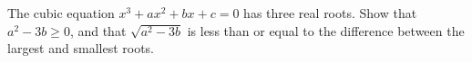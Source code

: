 The cubic equation $x^3 + ax^2 + bx + c = 0$ has three real roots.  Show that $a^2-3b\geq 0$,  and that $\sqrt{a^2-3b}$ is less than or equal to the difference between the largest and smallest roots.